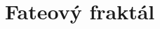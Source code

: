 \documentclass[../main.tex]{subfiles}
\begin{document}
\section{Fateový fraktál}
\label{sec:fraktal}
\end{document}
